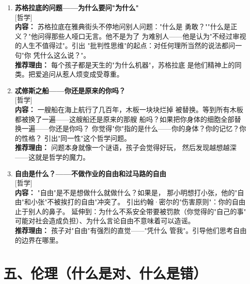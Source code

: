 \documentclass[a4paper,12pt]{ctexart}
\newcommand{\tagphilosophy}{\textcolor{philosophy}{\small [哲学]}}
\begin{document}
\begin{enumerate}

\item[\textbf{第12课}] \textbf{苏格拉底的问题——为什么要问"为什么"} \\
\tagphilosophy \\
\textbf{内容：} 苏格拉底在雅典街头不停地问别人问题："什么是
勇敢？""什么是正义？"他问得那些人哑口无言。他不是为了
为难别人——他是认为"不经过审视的人生不值得过"。引出
"批判性思维"的起点：对任何理所当然的说法都问一句"你
凭什么这么说？"。\\
\textbf{推荐理由：} 每个孩子都是天生的"为什么机器"，苏格拉底
是他们精神上的同类。把爱追问从惹人烦变成受尊重。

\item[\textbf{第13课}] \textbf{忒修斯之船——你还是原来的你吗？} \\
\tagphilosophy \\
\textbf{内容：} 一艘船在海上航行了几百年，木板一块块烂掉
被替换。等到所有木板都被换了一遍——这艘船还是原来的那艘
船吗？如果把你身体的细胞全部替换一遍——你还是你吗？
你觉得"你"指的是什么——你的身体？你的记忆？你的性格？
引出"同一性"这个哲学问题。\\
\textbf{推荐理由：} 问题本身就像一个谜语，孩子会觉得好玩，
然后发现越想越深——这就是哲学的魔力。

\item[\textbf{第14课}] \textbf{自由是什么？——不做作业的自由和过马路的自由} \\
\tagphilosophy \\
\textbf{内容：} "自由"是不是想做什么就做什么？如果是，
那小明想打小张，他的"自由"和小张"不被挨打的自由"冲突了。
引出约翰·密尔的"伤害原则"：你的自由止于别人的鼻子。
延伸到：为什么不系安全带要被罚款（你觉得的"自己的事"
可能对社会造成负担）、为什么言论自由不意味着可以造谣。\\
\textbf{推荐理由：} 孩子对"自由"有强烈的直觉——"凭什么
管我"。引导他们思考自由的边界在哪里。

\end{enumerate}

\section*{\textcolor{orange!80!black}{五、伦理（什么是对、什么是错）}}
\end{document}
